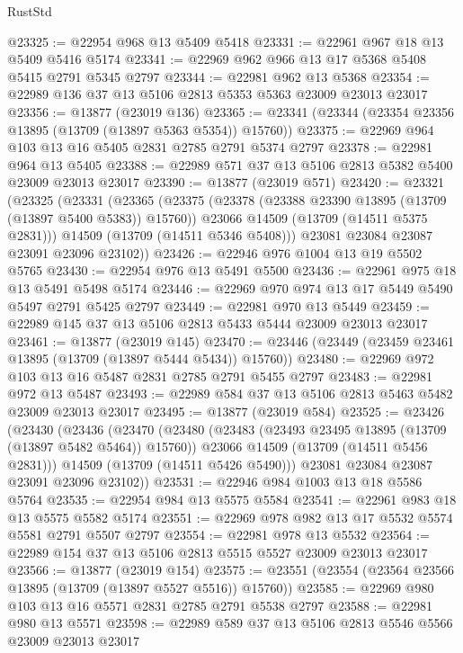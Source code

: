 \begin{lexlean}{RustStd}
\begin{coremodule}
@23325 := @22954 @968 @13 @5409 @5418
@23331 := @22961 @967 @18 @13 @5409 @5416 @5174
@23341 := @22969 @962 @966 @13 @17 @5368 @5408 @5415 @2791 @5345 @2797
@23344 := @22981 @962 @13 @5368
@23354 := @22989 @136 @37 @13 @5106 @2813 @5353 @5363 @23009 @23013 @23017
@23356 := @13877 (@23019 @136)
@23365 := @23341 (@23344 (@23354 @23356 @13895 (@13709 (@13897 @5363 @5354)) @15760))
@23375 := @22969 @964 @103 @13 @16 @5405 @2831 @2785 @2791 @5374 @2797
@23378 := @22981 @964 @13 @5405
@23388 := @22989 @571 @37 @13 @5106 @2813 @5382 @5400 @23009 @23013 @23017
@23390 := @13877 (@23019 @571)
@23420 := @23321
    (@23325
      (@23331
        (@23365
          (@23375
            (@23378 (@23388 @23390 @13895 (@13709 (@13897 @5400 @5383)) @15760))
            @23066
            @14509
            (@13709 (@14511 @5375 @2831)))
          @14509
          (@13709 (@14511 @5346 @5408)))
        @23081
        @23084
        @23087
        @23091
        @23096
        @23102))
@23426 := @22946 @976 @1004 @13 @19 @5502 @5765
@23430 := @22954 @976 @13 @5491 @5500
@23436 := @22961 @975 @18 @13 @5491 @5498 @5174
@23446 := @22969 @970 @974 @13 @17 @5449 @5490 @5497 @2791 @5425 @2797
@23449 := @22981 @970 @13 @5449
@23459 := @22989 @145 @37 @13 @5106 @2813 @5433 @5444 @23009 @23013 @23017
@23461 := @13877 (@23019 @145)
@23470 := @23446 (@23449 (@23459 @23461 @13895 (@13709 (@13897 @5444 @5434)) @15760))
@23480 := @22969 @972 @103 @13 @16 @5487 @2831 @2785 @2791 @5455 @2797
@23483 := @22981 @972 @13 @5487
@23493 := @22989 @584 @37 @13 @5106 @2813 @5463 @5482 @23009 @23013 @23017
@23495 := @13877 (@23019 @584)
@23525 := @23426
    (@23430
      (@23436
        (@23470
          (@23480
            (@23483 (@23493 @23495 @13895 (@13709 (@13897 @5482 @5464)) @15760))
            @23066
            @14509
            (@13709 (@14511 @5456 @2831)))
          @14509
          (@13709 (@14511 @5426 @5490)))
        @23081
        @23084
        @23087
        @23091
        @23096
        @23102))
@23531 := @22946 @984 @1003 @13 @18 @5586 @5764
@23535 := @22954 @984 @13 @5575 @5584
@23541 := @22961 @983 @18 @13 @5575 @5582 @5174
@23551 := @22969 @978 @982 @13 @17 @5532 @5574 @5581 @2791 @5507 @2797
@23554 := @22981 @978 @13 @5532
@23564 := @22989 @154 @37 @13 @5106 @2813 @5515 @5527 @23009 @23013 @23017
@23566 := @13877 (@23019 @154)
@23575 := @23551 (@23554 (@23564 @23566 @13895 (@13709 (@13897 @5527 @5516)) @15760))
@23585 := @22969 @980 @103 @13 @16 @5571 @2831 @2785 @2791 @5538 @2797
@23588 := @22981 @980 @13 @5571
@23598 := @22989 @589 @37 @13 @5106 @2813 @5546 @5566 @23009 @23013 @23017

\end{coremodule}
\end{lexlean}
